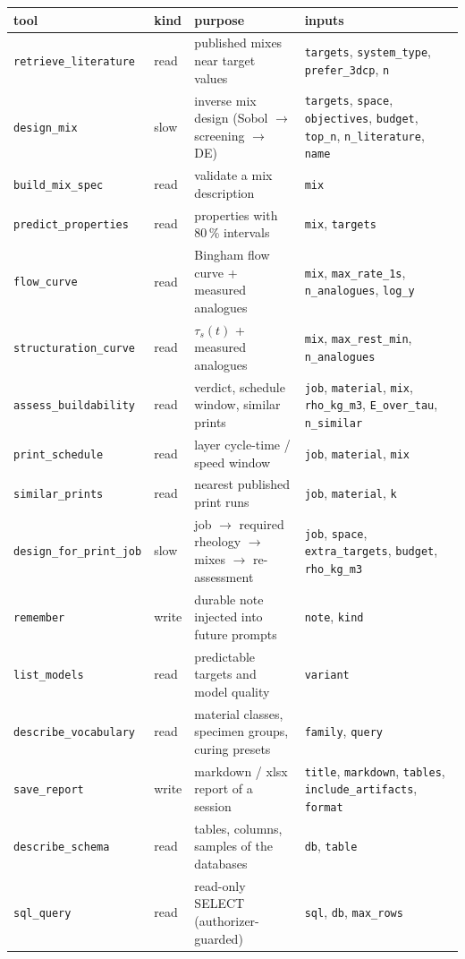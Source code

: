 \begin{tabular}{@{}lp{0.8cm}p{4.9cm}p{5.4cm}@{}}
\toprule
tool & kind & purpose & inputs \\
\midrule
\texttt{retrieve\_literature} & read & published mixes near target values & \texttt{targets}, \texttt{system\_type}, \texttt{prefer\_3dcp}, \texttt{n} \\
\texttt{design\_mix} & slow & inverse mix design (Sobol $\rightarrow$ screening $\rightarrow$ DE) & \texttt{targets}, \texttt{space}, \texttt{objectives}, \texttt{budget}, \texttt{top\_n}, \texttt{n\_literature}, \texttt{name} \\
\texttt{build\_mix\_spec} & read & validate a mix description & \texttt{mix} \\
\texttt{predict\_properties} & read & properties with 80\,\% intervals & \texttt{mix}, \texttt{targets} \\
\texttt{flow\_curve} & read & Bingham flow curve + measured analogues & \texttt{mix}, \texttt{max\_rate\_1s}, \texttt{n\_analogues}, \texttt{log\_y} \\
\texttt{structuration\_curve} & read & $\tau_s(t)$ + measured analogues & \texttt{mix}, \texttt{max\_rest\_min}, \texttt{n\_analogues} \\
\texttt{assess\_buildability} & read & verdict, schedule window, similar prints & \texttt{job}, \texttt{material}, \texttt{mix}, \texttt{rho\_kg\_m3}, \texttt{E\_over\_tau}, \texttt{n\_similar} \\
\texttt{print\_schedule} & read & layer cycle-time / speed window & \texttt{job}, \texttt{material}, \texttt{mix} \\
\texttt{similar\_prints} & read & nearest published print runs & \texttt{job}, \texttt{material}, \texttt{k} \\
\texttt{design\_for\_print\_job} & slow & job $\rightarrow$ required rheology $\rightarrow$ mixes $\rightarrow$ re-assessment & \texttt{job}, \texttt{space}, \texttt{extra\_targets}, \texttt{budget}, \texttt{rho\_kg\_m3} \\
\texttt{remember} & write & durable note injected into future prompts & \texttt{note}, \texttt{kind} \\
\texttt{list\_models} & read & predictable targets and model quality & \texttt{variant} \\
\texttt{describe\_vocabulary} & read & material classes, specimen groups, curing presets & \texttt{family}, \texttt{query} \\
\texttt{save\_report} & write & markdown / xlsx report of a session & \texttt{title}, \texttt{markdown}, \texttt{tables}, \texttt{include\_artifacts}, \texttt{format} \\
\texttt{describe\_schema} & read & tables, columns, samples of the databases & \texttt{db}, \texttt{table} \\
\texttt{sql\_query} & read & read-only SELECT (authorizer-guarded) & \texttt{sql}, \texttt{db}, \texttt{max\_rows} \\
\bottomrule
\end{tabular}